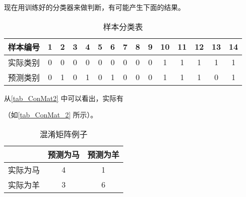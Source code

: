 现在用训练好的分类器来做判断，有可能产生下面的结果。

\begin{table}[ht]
\centering
\caption{样本分类表}\label{tab_ConMat2}
\begin{tabular}{|c|c|c|c|c|c|c|c|c|c|c|c|c|c|c|}
\hline
样本编号 & 1 & 2 & 3 & 4 & 5 & 6 & 7 & 8 & 9 & 10 & 11 & 12 & 13 & 14 \\
\hline
实际类别 & 0 & 0 & 0 & 0 & 0 & 0 & 0 & 0 & 0 & 1 & 1 & 1 & 1 & 1 \\
\hline
预测类别 & 0 & 1 & 0 & 1 & 0 & 1 & 0 & 0 & 0 & 1 & 1 & 1 & 0 & 1 \\
\hline
\end{tabular}
\end{table}

从\autoref{tab_ConMat2} 中可以看出，实际有

（如\autoref{tab_ConMat_2} 所示）。
\begin{table}[ht]
\centering
\caption{混淆矩阵例子}\label{tab_ConMat_2}
\begin{tabular}{|c|c|c|}
\hline
 & 预测为马 & 预测为羊 \\
\hline
实际为马 & 4 & 1 \\
\hline
实际为羊 & 3 & 6 \\
\hline
\end{tabular}
\end{table}
